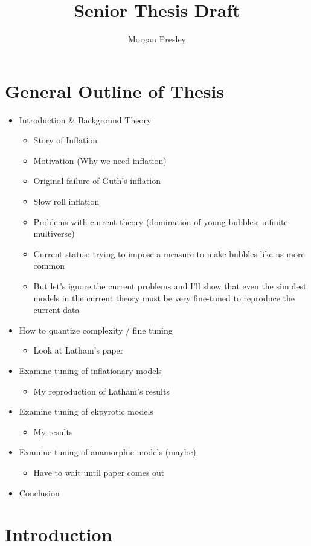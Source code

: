 \documentclass[onecolumn,apj]{emulateapj}
\begin{document}
\title{Senior Thesis Draft}
\author{Morgan Presley}

\section{General Outline of Thesis}
\begin{itemize}
	\item Introduction \& Background Theory
		\begin{itemize}
			\item Story of Inflation
			\item Motivation (Why we need inflation)
			\item Original failure of Guth's inflation
			\item Slow roll inflation
			\item Problems with current theory (domination of young bubbles; infinite multiverse)
			\item Current status: trying to impose a measure to make bubbles like us more common
			\item But let's ignore the current problems and I'll show that even the simplest models in the current theory must be very fine-tuned to reproduce the current data
		\end{itemize}
	\item How to quantize complexity / fine tuning
		\begin{itemize}
			\item Look at Latham's paper
		\end{itemize}
	\item Examine tuning of inflationary models
		\begin{itemize}
			\item My reproduction of Latham's results
		\end{itemize}
	\item Examine tuning of ekpyrotic models
		\begin{itemize}
			\item My results
		\end{itemize}
	\item Examine tuning of anamorphic models (maybe)
		\begin{itemize}
			\item Have to wait until paper comes out
		\end{itemize}	
	\item Conclusion
\end{itemize}

\section{Introduction}
\end{document}
